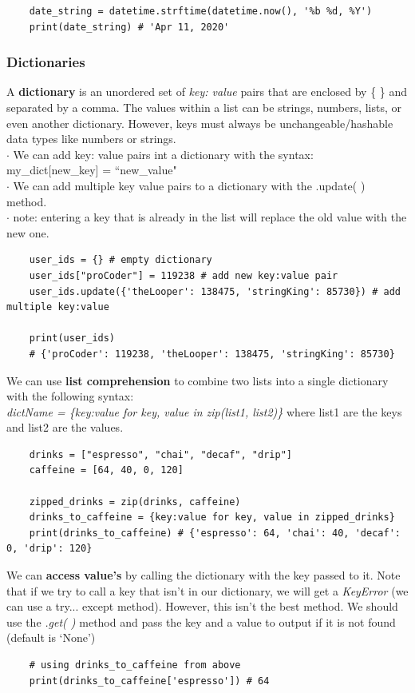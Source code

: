 \documentclass[11pt, a4paper]{article}
\begin{document}
\begin{spacing}{1.1}
\begin{lstlisting}
	date_string = datetime.strftime(datetime.now(), '%b %d, %Y')  
	print(date_string) # 'Apr 11, 2020' \end{lstlisting} \newpage
	\subsubsection{Dictionaries}
	A \textbf{dictionary} is an unordered set of \textit{key: value} pairs that are enclosed by \{ \} and separated by a comma.
	The values within a list can be strings, numbers, lists, or even another dictionary. However, keys must always be unchangeable/hashable data types like numbers or strings.\\ 
	\hspace*{1.5mm} $\cdot$ We can add key: value pairs int a dictionary with the syntax: my\_dict[new\_key] = ``new\_value" \\
	\hspace*{1.5mm} $\cdot$ We can add multiple key value pairs to a dictionary with the .update( ) method. \\
	\hspace*{1.5mm} $\cdot$ note: entering a key that is already in the list will replace the old value with the new one.
	\begin{lstlisting}
	user_ids = {} # empty dictionary
	user_ids["proCoder"] = 119238 # add new key:value pair
	user_ids.update({'theLooper': 138475, 'stringKing': 85730}) # add multiple key:value
	
	print(user_ids) 
	# {'proCoder': 119238, 'theLooper': 138475, 'stringKing': 85730} \end{lstlisting}\vspace*{1mm}
	We can use \textbf{list comprehension} to combine two lists into a single dictionary with the following syntax: \\
	\textit{dictName = \{key:value for key, value in zip(list1, list2)\}} where list1 are the keys and list2 are the values.
	\begin{lstlisting}
	drinks = ["espresso", "chai", "decaf", "drip"]
	caffeine = [64, 40, 0, 120]
	
	zipped_drinks = zip(drinks, caffeine)
	drinks_to_caffeine = {key:value for key, value in zipped_drinks}
	print(drinks_to_caffeine) # {'espresso': 64, 'chai': 40, 'decaf': 0, 'drip': 120} \end{lstlisting}\vspace*{1mm}
	We can \textbf{access value's} by calling the dictionary with the key passed to it. Note that if we try to call a key that isn't in our dictionary, we will get a \textit{KeyError} (we can use a try... except method). However, this isn't the best method. We should use the \textit{.get( )} method and pass the key and a value to output if it is not found (default is `None')
	\begin{lstlisting}
	# using drinks_to_caffeine from above
	print(drinks_to_caffeine['espresso']) # 64 
	

\end{lstlisting}
\end{spacing}
\end{document}
